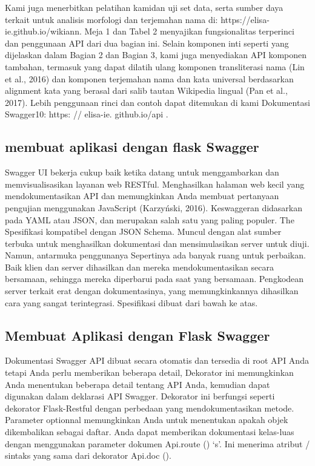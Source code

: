 \documentclass[12pt]{article}
\begin{document}
Kami juga menerbitkan pelatihan kamidan uji set data, serta sumber daya terkait untuk analisis morfologi dan terjemahan nama di: https://elisa-ie.github.io/wikiann. Meja 1 dan Tabel 2 menyajikan fungsionalitas terperinci dan penggunaan API dari dua bagian ini. Selain komponen inti seperti yang dijelaskan dalam Bagian 2 dan Bagian 3, kami juga menyediakan API komponen tambahan, termasuk yang dapat dilatih ulang komponen transliterasi nama (Lin et al., 2016) dan komponen terjemahan nama dan kata universal berdasarkan alignment kata yang berasal dari salib tautan Wikipedia lingual (Pan et al., 2017). Lebih penggunaan rinci dan contoh dapat ditemukan di kami Dokumentasi Swagger10: https: // elisa-ie. github.io/api \cite{zhangelisa}.

\subsection{membuat aplikasi dengan flask Swagger }
Swagger UI bekerja cukup baik ketika datang untuk menggambarkan dan memvisualisasikan layanan web RESTful. Menghasilkan halaman web kecil yang mendokumentasikan API dan memungkinkan Anda membuat pertanyaan pengujian menggunakan JavaScript (Karzyński, 2016). Keswaggeran didasarkan pada YAML atau JSON, dan merupakan salah satu yang paling populer. The Spesifikasi kompatibel dengan JSON Schema. Muncul dengan alat sumber terbuka untuk menghasilkan dokumentasi dan mensimulasikan server untuk diuji. Namun, antarmuka penggunanya Sepertinya ada banyak ruang untuk perbaikan. Baik klien dan server dihasilkan dan mereka mendokumentasikan secara bersamaan, sehingga mereka diperbarui pada saat yang bersamaan. Pengkodean server terkait erat dengan dokumentasinya, yang memungkinkannya dihasilkan cara yang sangat terintegrasi. Spesifikasi dibuat dari bawah ke atas\cite{ortegacatalogo}.

\subsection{Membuat Aplikasi dengan Flask Swagger}
Dokumentasi Swagger API dibuat secara otomatis dan tersedia di root API Anda tetapi Anda perlu memberikan beberapa detail, Dekorator ini memungkinkan Anda menentukan beberapa detail tentang API Anda, kemudian dapat digunakan dalam deklarasi API Swagger. Dekorator ini berfungsi seperti dekorator Flask-Restful dengan perbedaan yang mendokumentasikan metode. Parameter optionnal memungkinkan Anda untuk menentukan apakah objek dikembalikan sebagai daftar. Anda dapat memberikan dokumentasi kelas-luas dengan menggunakan parameter dokumen Api.route () ‘s’. Ini menerima atribut / sintaks yang sama dari dekorator Api.doc ()\cite{de2017api}.
\end{document}
